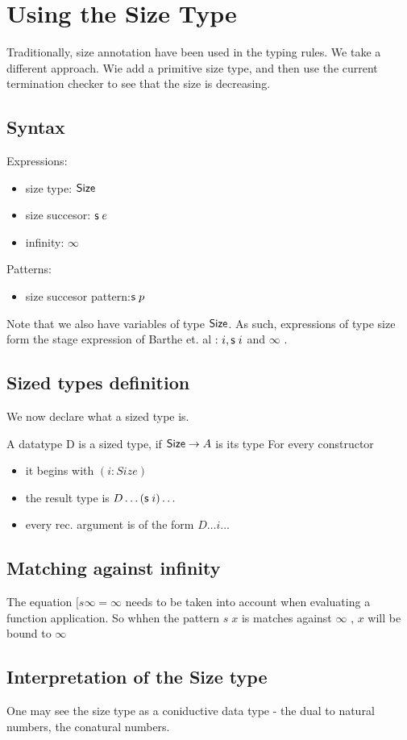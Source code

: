 \chapter{Using the Size Type}
Traditionally, size annotation have been used in the typing rules.
We take a different approach.
Wie add a primitive size type, and then use the current termination checker to see that the size is 
decreasing.
\section{Syntax}

Expressions:
\begin{itemize}
\item
size type: $ \mathsf{Size} $ 
\item
size succesor: $\mathsf{s}\; e $ 
\item
infinity: $\infty$ 
\end{itemize}
Patterns:
\begin{itemize}
\item
size succesor pattern:$ \mathsf{s}\; p $ 
\end{itemize}
Note that we also have variables of type $\mathsf{Size}$.
As such, expressions of type size form the stage expression of Barthe et. al :  $ i , \mathsf{s}\; i $ and $ \infty $ .
\section{Sized types definition}
We now declare what a sized type is.
\begin{definition}
A datatype D is a sized type, if $ \mathsf{Size} \rightarrow A $ is its type
For every constructor 
\begin{itemize}
\item
it begins with $(i: Size)$
\item
the result type is $D \dots (\mathsf{s}\; i) \dots $
\item
every rec. argument is of the form $ D \dots i \dots $
\end{itemize}
\end{definition}
\section{Matching against infinity}
The equation 
$[ s \infty = \infty $
needs to be taken into account when evaluating a function application.
So whhen the pattern $ s \; x $ is matches against $ \infty $ , $x$ will be bound to $ \infty $  
\section{Interpretation of the Size type}
One may see the size type as a coniductive data type - the dual to natural numbers, the conatural numbers.
